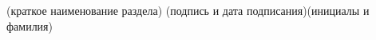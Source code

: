 \begin{titlepage}
\begin{flushleft}
	\normalsize\\
\underline{\hspace{7.5cm}}\hspace{1cm}\underline{\hspace{4cm}}\hspace{1cm}
	\underline{\hspace{4cm}}\\
\vspace{-.2cm}\hspace{1.5cm}\footnotesize(краткое наименование раздела)
	\hspace{2cm}(подпись и дата подписания)\hspace{1.1cm}(инициалы и фамилия)\normalsize\\
\end{flushleft}
	\thispagestyle{empty}
\end{titlepage}
\setcounter{page}{3}

\newpage